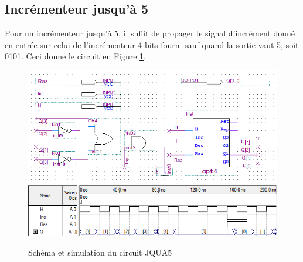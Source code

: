 \documentclass[a4paper,11pt]{article}
\begin{document}
\clearpage

\subsection*{Incrémenteur jusqu'à 5}

Pour un incrémenteur jusqu'à 5, il suffit de propager le signal d'incrément donné en entrée sur celui de l'incrémenteur 4 bits fourni sauf quand la sortie vaut 5, soit 0101. Ceci donne le circuit en Figure \ref{jqua5}.

\begin{figure}[h]
\center
\includegraphics[scale=0.6]{jqua5.PNG}\vspace{1em}
\includegraphics[scale=0.6]{sim3.PNG}
\caption{Schéma et simulation du circuit JQUA5}
\label{jqua5}
\end{figure}
\end{document}
